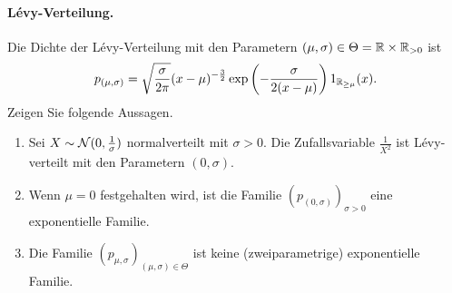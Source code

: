\paragraph{L\'evy-Verteilung.} Die Dichte der L\'evy-Verteilung mit den
Parametern $(\mu,\sigma)\in \Theta = \mathbb R \times \mathbb R_{>0}$ ist
\begin{equation*}
    p_{(\mu, \sigma)} = \sqrt{ \frac{\sigma}{2\pi}} (x-\mu)^{-\frac{3}{2}} 
    \exp\left( -\frac{\sigma}{2(x-\mu)} \right) 1_{\mathbb R_{\geq \mu}} (x).
\end{equation*}
Zeigen Sie folgende Aussagen.
\begin{enumerate}
    \item Sei $X\sim \mathcal N (0, \frac{1}{\sigma})$ normalverteilt mit $\sigma>0$.
        Die Zufallsvariable $\frac{1}{X^2}$ ist L\'evy-verteilt mit den Parametern
        $(0,\sigma)$.
    \item Wenn $\mu=0$ festgehalten wird, ist die Familie $(p_{(0,\sigma)})_{\sigma>0}$
        eine exponentielle Familie. 
    \item Die Familie $(p_{\mu,\sigma})_{(\mu,\sigma)\in\Theta}$ ist keine
        (zweiparametrige) exponentielle Familie. 
\end{enumerate}

